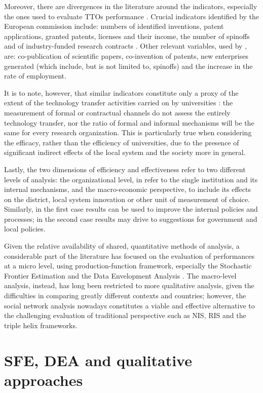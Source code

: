 Moreover, there are divergences in the literature around the indicators, especially the ones used to evaluate TTOs performance \citet{Muscio2010}. Crucial indicators identified by the European commission include: numbers of identified inventions, patent applications, granted patents, licenses and their income, the number of spinoffs and of industry-funded research contracts \citep{Balderi2010}. Other relevant variables, used by \citet{Guerrero2014}, are: co-publication of scientific papers, co-invention of patents, new enterprises generated (which include, but is not limited to, spinoffs) and the increase in the rate of employment. 

It is to note, however, that similar indicators constitute only a proxy of the extent of the technology transfer activities carried on by universities \citep{Leydesdorff2010}: the measurement of formal or contractual channels do not assess the entirely technology transfer, nor the ratio of formal and informal mechanisms will be the same for every research organization. This is particularly true when considering the efficacy, rather than the efficiency of universities, due to the presence of significant indirect effects of the local system and the society more in general.

Lastly, the two dimensions of efficiency and effectiveness refer to two different levels of analysis: the organizational level, in refer to the single institution and its internal mechanisms, and the macro-economic perspective, to include its effects on the district, local system innovation or other unit of measurement of choice. Similarly, in the first case results can be used to improve the internal policies and processes; in the second case results may drive to suggestions for government and local policies.

Given the relative availability of shared, quantitative methods of analysis, a considerable part of the literature has focused on the evaluation of performances at a micro level, using production-function framework, especially the Stochastic Frontier Estimation and the Data Envelopment Analysis \citep{Siegel2007}. The macro-level analysis, instead, has long been restricted to more qualitative analysis, given the difficulties in comparing greatly different contexts and countries; however, the social network analysis nowadays constitutes a viable and effective alternative to the challenging evaluation of traditional perspective such as NIS, RIS and the triple helix frameworks.

\section{SFE, DEA and qualitative approaches}

